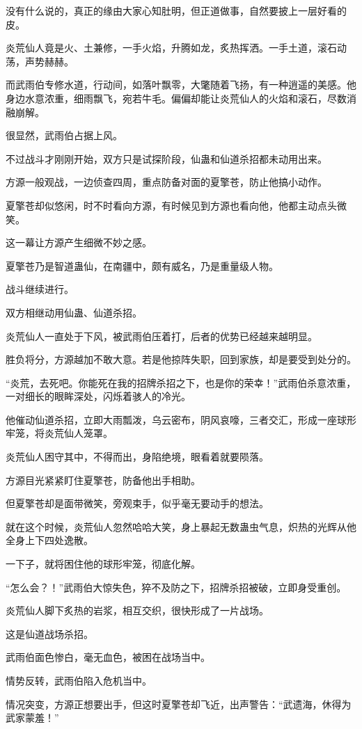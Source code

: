 \begin{this_body}
没有什么说的，真正的缘由大家心知肚明，但正道做事，自然要披上一层好看的皮。

炎荒仙人竟是火、土兼修，一手火焰，升腾如龙，炙热挥洒。一手土道，滚石动荡，声势赫赫。

而武雨伯专修水道，行动间，如落叶飘零，大氅随着飞扬，有一种逍遥的美感。他身边水意浓重，细雨飘飞，宛若牛毛。偏偏却能让炎荒仙人的火焰和滚石，尽数消融崩解。

很显然，武雨伯占据上风。

不过战斗才刚刚开始，双方只是试探阶段，仙蛊和仙道杀招都未动用出来。

方源一般观战，一边侦查四周，重点防备对面的夏擎苍，防止他搞小动作。

夏擎苍却似悠闲，时不时看向方源，有时候见到方源也看向他，他都主动点头微笑。

这一幕让方源产生细微不妙之感。

夏擎苍乃是智道蛊仙，在南疆中，颇有威名，乃是重量级人物。

战斗继续进行。

双方相继动用仙蛊、仙道杀招。

炎荒仙人一直处于下风，被武雨伯压着打，后者的优势已经越来越明显。

胜负将分，方源越加不敢大意。若是他掠阵失职，回到家族，却是要受到处分的。

“炎荒，去死吧。你能死在我的招牌杀招之下，也是你的荣幸！”武雨伯杀意浓重，一对细长的眼眸深处，闪烁着骇人的冷光。

他催动仙道杀招，立即大雨瓢泼，乌云密布，阴风哀嚎，三者交汇，形成一座球形牢笼，将炎荒仙人笼罩。

炎荒仙人困守其中，不得而出，身陷绝境，眼看着就要陨落。

方源目光紧紧盯住夏擎苍，防备他出手相助。

但夏擎苍却是面带微笑，旁观束手，似乎毫无要动手的想法。

就在这个时候，炎荒仙人忽然哈哈大笑，身上暴起无数蛊虫气息，炽热的光辉从他全身上下四处逸散。

一下子，就将困住他的球形牢笼，彻底化解。

“怎么会？！”武雨伯大惊失色，猝不及防之下，招牌杀招被破，立即身受重创。

炎荒仙人脚下炙热的岩浆，相互交织，很快形成了一片战场。

这是仙道战场杀招。

武雨伯面色惨白，毫无血色，被困在战场当中。

情势反转，武雨伯陷入危机当中。

情况突变，方源正想要出手，但这时夏擎苍却飞近，出声警告：“武遗海，休得为武家蒙羞！”


\end{this_body}
